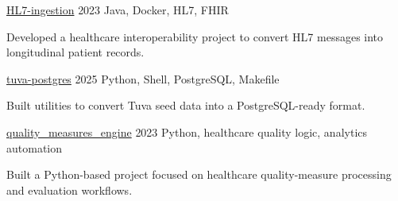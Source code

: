 \begin{cventries}

\cvshortentry
  {\href{https://github.com/bubnicbf/HL7-ingestion}{HL7-ingestion}}
  {2023}
  {Java, Docker, HL7, FHIR}
    \begin{flushleft} %
      Developed a healthcare interoperability project to convert HL7 messages into longitudinal patient records.
    \end{flushleft}


\cvshortentry
  {\href{https://github.com/bubnicbf/tuva-postgres}{tuva-postgres}}
  {2025}
  {Python, Shell, PostgreSQL, Makefile}
    \begin{flushleft} %
      Built utilities to convert Tuva seed data into a PostgreSQL-ready format.
    \end{flushleft}


\cvshortentry
  {\href{https://github.com/bubnicbf/quality_measures_engine}{quality\_measures\_engine}}
  {2023}
  {Python, healthcare quality logic, analytics automation}
    \begin{flushleft} %
      Built a Python-based project focused on healthcare quality-measure processing and evaluation workflows.
    \end{flushleft}


\end{cventries}

